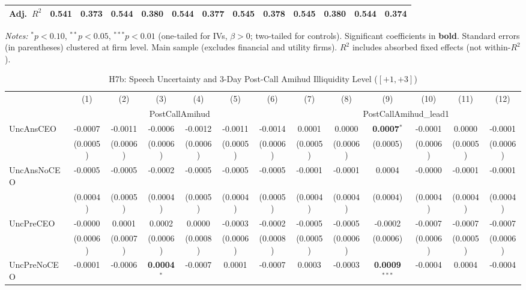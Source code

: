 \documentclass[11pt,a4paper]{article}
\begin{document}
\begin{table}[htbp]
\begin{tabular}{lcccccccccccc}
Adj.~$R^2$ & 0.541 & 0.373 & 0.544 & 0.380 & 0.544 & 0.377 & 0.545 & 0.378 & 0.545 & 0.380 & 0.544 & 0.374 \\
\bottomrule
\end{tabular}
\begin{minipage}{\linewidth}
\vspace{2pt}\scriptsize
\textit{Notes:} $^{*}p<0.10$, $^{**}p<0.05$, $^{***}p<0.01$ (one-tailed for IVs, $\beta > 0$; two-tailed for controls).
 Significant coefficients in \textbf{bold}.
 Standard errors (in parentheses) clustered at firm level.
 Main sample (excludes financial and utility firms).
 $R^2$ includes absorbed fixed effects (not within-$R^2$).
\end{minipage}
\end{table}
\clearpage
\begin{table}[htbp]
\centering
\caption{H7b: Speech Uncertainty and 3-Day Post-Call Amihud Illiquidity Level ($[+1,+3]$)}
\label{tab:h7b_robust}
\scriptsize
\begin{tabular}{lcccccccccccc}
\toprule
 & (1) & (2) & (3) & (4) & (5) & (6) & (7) & (8) & (9) & (10) & (11) & (12) \\
 & \multicolumn{6}{c}{PostCallAmihud} & \multicolumn{6}{c}{PostCallAmihud\_lead1} \\
\cmidrule(lr){2-7} \cmidrule(lr){8-13}
\midrule
UncAnsCEO & -0.0007 & -0.0011 & -0.0006 & -0.0012 & -0.0011 & -0.0014 & 0.0001 & 0.0000 & \textbf{0.0007}$^{*}$ & -0.0001 & 0.0000 & -0.0001 \\
 & (0.0005) & (0.0006) & (0.0006) & (0.0006) & (0.0005) & (0.0006) & (0.0005) & (0.0006) & (0.0005) & (0.0006) & (0.0005) & (0.0006) \\
UncAnsNoCEO & -0.0005 & -0.0005 & -0.0002 & -0.0005 & -0.0005 & -0.0005 & -0.0001 & -0.0001 & 0.0004 & -0.0000 & -0.0001 & -0.0001 \\
 & (0.0004) & (0.0005) & (0.0004) & (0.0005) & (0.0004) & (0.0005) & (0.0004) & (0.0004) & (0.0004) & (0.0004) & (0.0004) & (0.0004) \\
UncPreCEO & -0.0000 & 0.0001 & 0.0002 & 0.0000 & -0.0003 & -0.0002 & -0.0005 & -0.0005 & -0.0002 & -0.0007 & -0.0007 & -0.0007 \\
 & (0.0006) & (0.0007) & (0.0006) & (0.0008) & (0.0006) & (0.0008) & (0.0005) & (0.0006) & (0.0006) & (0.0006) & (0.0005) & (0.0006) \\
UncPreNoCEO & -0.0001 & -0.0006 & \textbf{0.0004}$^{*}$ & -0.0007 & 0.0001 & -0.0007 & 0.0003 & -0.0003 & \textbf{0.0009}$^{***}$ & -0.0004 & 0.0004 & -0.0004 \\

\end{tabular}
\end{table}
\end{document}

